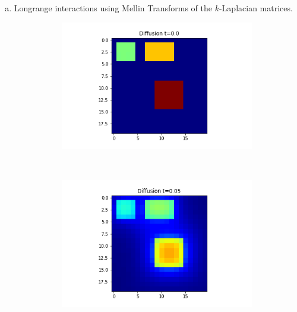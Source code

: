 \documentclass[10pt,a4paper]{article}
\begin{document}
\begin{enumerate}[i)]
\begin{enumerate}[a)]
    		\item Longrange interactions using Mellin Transforms of the $k$-Laplacian matrices.
    		\begin{figure}[!h]
    			\centering
    			\begin{subfigure}[b]{0.25\textwidth}
    				\includegraphics[width=\textwidth]{images/mellin-x2-t0.png}
    			\end{subfigure}~
    			\begin{subfigure}[b]{0.25\textwidth}
    				\includegraphics[width= \textwidth]{images/mellin-x2-t05.png}
    			\end{subfigure}~
    			\begin{subfigure}[b]{0.25\textwidth}

\end{subfigure}
\end{figure}
\end{enumerate}
\end{enumerate}
\end{document}

